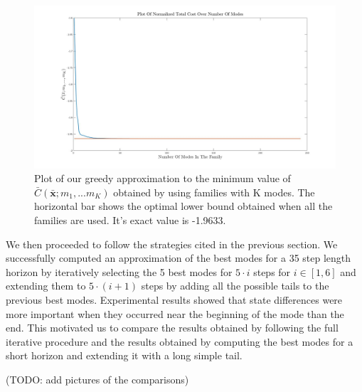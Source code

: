 \documentclass[12,twoside]{TFG-GM}
\theoremstyle{definition}
\theoremstyle{remark}
\newcommand*\diff[1]{\bar{#1}}
\begin{document}
\begin{figure}[htb!]
\begin{center}
\includegraphics[width=16cm]{cost_over_modes.jpg}
\caption{\label{fig:cost_over_modes} \small Plot of our greedy approximation to the minimum value of $\diff{C}(\diff{\textbf{x}}; m_1, ... m_K)$ obtained by using families with K modes. The horizontal bar shows the optimal lower bound obtained when all the families are used. It's exact value is -1.9633.}
\end{center}
\end{figure}

We then proceeded to follow the strategies cited in the previous section. We successfully computed an approximation of the best modes for a 35 step length horizon by iteratively selecting the 5 best modes for $5 \cdot i$ steps for $i \in [1, 6]$ and extending them to $5 \cdot (i + 1)$ steps by adding all the possible tails to the previous best modes. Experimental results showed that state differences were more important when they occurred near the beginning of the mode than the end. This motivated us to compare the results obtained by following the full iterative procedure and the results obtained by computing the best modes for a short horizon and extending it with a long simple tail.

(TODO: add pictures of the comparisons)
\end{document}
